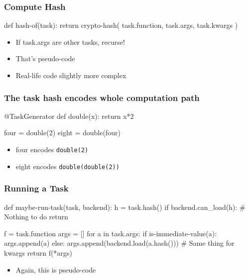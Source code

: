 \documentclass{beamer}
\begin{document}
\begin{frame}[fragile]
\frametitle{Compute Hash}

\begin{python}
def hash-of(task):
    return crypto-hash( {
            task.function,
            task.args,
            task.kwargs })
\end{python}

\begin{itemize}
\item If \alert{task.args} are other tasks, recurse!
\item That's \alert{pseudo-code}
\item Real-life code \alert{slightly more complex}
\end{itemize}

\end{frame}

\begin{frame}[fragile]
\frametitle{The task hash encodes whole computation path}

\begin{python}
@TaskGenerator
def double(x):
    return x*2

four = double(2)
eight = double(four)
\end{python}

\begin{itemize}
\item \alert{four} encodes \verb+double(2)+
\item \alert{eight} encodes \verb+double(double(2))+
\end{itemize}

\end{frame}

\begin{frame}[fragile]
\frametitle{Running a Task}

\begin{python}
def maybe-run-task(task, backend):
    h = task.hash()
    if backend.can_load(h):
        # Nothing to do
        return
\end{python}
\pause
\begin{python}
    f = task.function
    args = []
    for a in task.args:
        if is-immediate-value(a):
            args.append(a)
        else:
            args.append(backend.load(a.hash()))
    # Same thing for kwargs
    return f(*args)

\end{python}

\begin{itemize}
\item Again, this is \alert{pseudo-code}
\end{itemize}

\end{frame}
\end{document}
